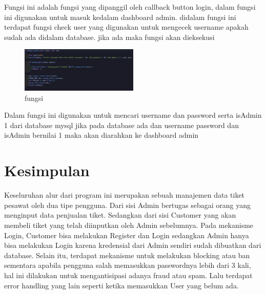 \documentclass[a4paper,12pt]{article}
\begin{document}
\FloatBarrier
Fungsi ini adalah fungsi yang dipanggil oleh callback button login, dalam fungsi ini digunakan untuk masuk kedalam dashboard admin. didalam fungsi ini terdapat
fungsi check user yang digunakan untuk mengecek username apakah sudah ada didalam database. jika ada maka fungsi \texttt{} akan dieksekusi
\begin{figure}[!htbp]
    \centering
    \includegraphics[width=0.5\textwidth]{./img/login_admin/login_mysql.png}
    \caption{fungsi \texttt{}}
\end{figure}
\FloatBarrier
Dalam fungsi \texttt{} ini digunakan untuk mencari username dan password serta isAdmin 1 dari database mysql 
jika pada database ada dan username password dan isAdmin bernilai 1 maka akan diarahkan ke dashboard admin

\section{Kesimpulan}
Keseluruhan alur dari program ini merupakan sebuah manajemen data tiket pesawat oleh dua tipe pengguna.
Dari sisi Admin bertugas sebagai orang yang menginput data penjualan tiket. Sedangkan dari sisi Customer yang akan membeli tiket yang telah diinputkan oleh Admin sebelumnya.
Pada mekanisme Login, Customer bisa melakukan Register dan Login sedangkan Admin hanya bisa melakukan Login karena kredensial dari Admin sendiri sudah dibuatkan dari database. Selain itu, terdapat mekanisme untuk melakukan blocking atau ban
sementara apabila pengguna salah memasukkan passwordnya lebih dari 3 kali, hal ini dilakukan untuk mengantisipasi adanya fraud atau spam. Lalu terdapat error handling yang lain seperti ketika memasukkan User yang belum ada.
\end{document}

